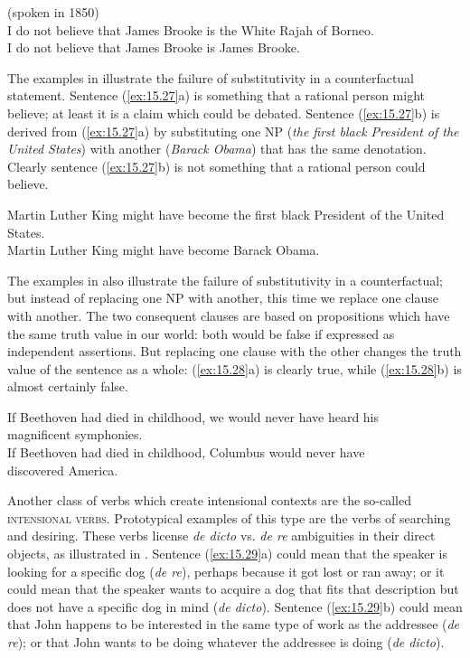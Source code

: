 \ea \label{ex:15.26}
(spoken in 1850)\\
\ea \label{ex:15.} I do not believe that James Brooke is the White Rajah of Borneo.\\
\ex I do not believe that James Brooke is James Brooke.
                       \z
\z


The examples in  illustrate the failure of substitutivity in a counterfactual statement. Sentence (\ref{ex:15.27}a) is something that a rational person might believe; at least it is a claim which could be debated. Sentence (\ref{ex:15.27}b) is derived from (\ref{ex:15.27}a) by substituting one NP (\textit{the first black President of the United States}) with another (\textit{Barack Obama}) that has the same denotation. Clearly sentence (\ref{ex:15.27}b) is not something that a rational person could believe.


\ea \label{ex:15.27}
\ea \label{ex:15.} Martin Luther King might have become the first black President of the United States.\\
\ex Martin Luther King might have become Barack Obama.
                       \z
\z


The examples in  also illustrate the failure of substitutivity in a counterfactual; but instead of replacing one NP with another, this time we replace one clause with another. The two consequent clauses are based on propositions which have the same truth value in our world: both would be false if expressed as independent assertions. But replacing one clause with the other changes the truth value of the sentence as a whole: (\ref{ex:15.28}a) is clearly true, while (\ref{ex:15.28}b) is almost certainly false.


\ea \label{ex:15.28}
\ea \label{ex:15.} If Beethoven had died in childhood, we would never have heard his\\
  magnificent symphonies.\\
\ex If Beethoven had died in childhood, Columbus would never have\\
  discovered America.
                       \z
\z


Another class of verbs which create intensional contexts are the so-called \textsc{intensional verbs}. Prototypical examples of this type are the verbs of searching and desiring. These verbs license \textit{de dicto} vs. \textit{de re} ambiguities in their direct objects, as illustrated in . Sentence (\ref{ex:15.29}a) could mean that the speaker is looking for a specific dog (\textit{de re}), perhaps because it got lost or ran away; or it could mean that the speaker wants to acquire a dog that fits that description but does not have a specific dog in mind (\textit{de dicto}). Sentence (\ref{ex:15.29}b) could mean that John happens to be interested in the same type of work as the addressee (\textit{de re}); or that John wants to be doing whatever the addressee is doing (\textit{de dicto}).


